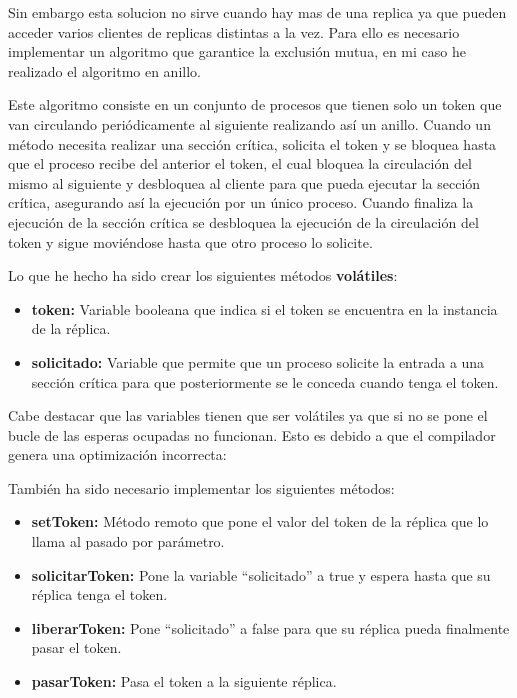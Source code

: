 \documentclass{article}
\begin{document}
Sin embargo esta solucion no sirve cuando hay mas de una replica ya que pueden acceder varios clientes de replicas distintas a la vez. Para ello es necesario implementar un algoritmo que garantice la exclusión mutua, en mi caso he realizado el algoritmo en anillo.

Este algoritmo consiste en un conjunto de procesos que tienen solo un token que van circulando periódicamente al siguiente realizando así un anillo. Cuando un método necesita realizar una sección crítica, solicita el token y se bloquea hasta que el proceso recibe del anterior el token, el cual bloquea la circulación del mismo al siguiente y desbloquea al cliente para que pueda ejecutar la sección crítica, asegurando así la ejecución por un único proceso. Cuando finaliza la ejecución de la sección crítica se desbloquea la ejecución de la circulación del token y sigue moviéndose hasta que otro proceso lo solicite.

Lo que he hecho ha sido crear los siguientes métodos \textbf{volátiles}:

\begin{itemize}
    \item \textbf{token: }Variable booleana que indica si el token se encuentra en la instancia de la réplica.
    \item \textbf{solicitado: }Variable que permite que un proceso solicite la entrada a una sección crítica para que posteriormente se le conceda cuando tenga el token.
\end{itemize}

Cabe destacar que las variables tienen que ser volátiles ya que si no se pone el bucle de las esperas ocupadas no funcionan. Esto es debido a que el compilador genera una optimización incorrecta:



También ha sido necesario implementar los siguientes métodos:

\begin{itemize}
    \item \textbf{setToken: }Método remoto que pone el valor del token de la réplica que lo llama al pasado por parámetro.
    \item \textbf{solicitarToken: }Pone la variable ``solicitado'' a true y espera hasta que su réplica tenga el token.
    \item \textbf{liberarToken: }Pone ``solicitado'' a false para que su réplica pueda finalmente pasar el token.
    \item \textbf{pasarToken: }Pasa el token a la siguiente réplica.
\end{itemize}
\end{document}
